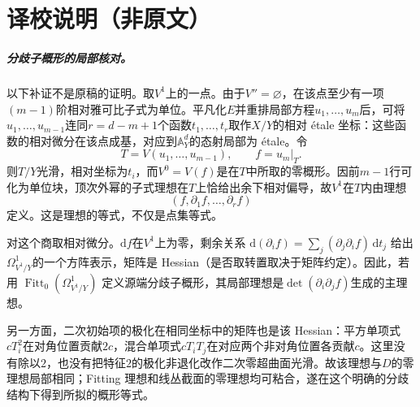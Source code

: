 \documentclass[openany,fontset=fandol]{ctexbook}
\begin{document}
\chapter*{译校说明（非原文）}
\paragraph{分歧子概形的局部核对。}
以下补证不是原稿的证明。取$V^1$上的一点。由于$V''=\varnothing$，在该点至少有一项$(m-1)$阶相对雅可比子式为单位。平凡化$E$并重排局部方程$u_1,\dots,u_m$后，可将$u_1,\dots,u_{m-1}$连同$r=d-m+1$个函数$t_1,\dots,t_r$取作$X/Y$的相对 étale 坐标：这些函数的相对微分在该点成基，对应到$\mathbb A^d_Y$的态射局部为 étale。令
\[
T=V(u_1,\dots,u_{m-1}),\qquad f=u_m|_T.
\]
则$T/Y$光滑，相对坐标为$t_i$，而$V^0=V(f)$是在$T$中所取的零概形。因前$m-1$行可化为单位块，顶次外幂的子式理想在$T$上恰给出余下相对偏导，故$V^1$在$T$内由理想
\[
(f,\partial_1 f,\dots,\partial_r f)
\]
定义。这是理想的等式，不仅是点集等式。

对这个商取相对微分。$\mathrm df$在$V^1$上为零，剩余关系
$\mathrm d(\partial_i f)=\sum_j(\partial_j\partial_i f)\,\mathrm dt_j$
给出$\Omega^1_{V^1/Y}$的一个方阵表示，矩阵是 Hessian（是否取转置取决于矩阵约定）。因此，若用
$\operatorname{Fitt}_0(\Omega^1_{V^1/Y})$
定义源端分歧子概形，其局部理想是$\det(\partial_i\partial_j f)$生成的主理想。

另一方面，二次初始项的极化在相同坐标中的矩阵也是该 Hessian：平方单项式$cT_i^2$在对角位置贡献$2c$，混合单项式$cT_iT_j$在对应两个非对角位置各贡献$c$。这里没有除以$2$，也没有把特征$2$的极化非退化改作二次零超曲面光滑。故该理想与$D$的零理想局部相同；Fitting 理想和线丛截面的零理想均可粘合，遂在这个明确的分歧结构下得到所拟的概形等式。
\end{document}
